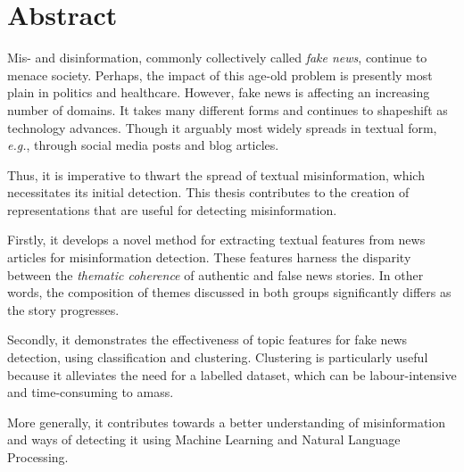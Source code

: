 \begingroup
\let\clearpage\relax
\let\cleardoublepage\relax
\let\cleardoublepage\relax

\chapter*{Abstract}

Mis- and disinformation, commonly collectively called \emph{fake news}, continue to menace society. Perhaps, the impact of this age-old problem is presently most plain in politics and healthcare. However, fake news is affecting an increasing number of domains. It takes many different forms and continues to shapeshift as technology advances. Though it arguably most widely spreads in textual form, \emph{e.g.}, through social media posts and blog articles.

Thus, it is imperative to thwart the spread of textual misinformation, which necessitates its initial detection. This thesis contributes to the creation of representations that are useful for detecting misinformation.

Firstly, it develops a novel method for extracting textual features from news articles for misinformation detection. These features harness the disparity between the \emph{thematic coherence} of authentic and false news stories. In other words, the composition of themes discussed in both groups significantly differs as the story progresses.

Secondly, it demonstrates the effectiveness of topic features for fake news detection, using classification and clustering. Clustering is particularly useful because it alleviates the need for a labelled dataset, which can be labour-intensive and time-consuming to amass.

More generally, it contributes towards a better understanding of misinformation and ways of detecting it using Machine Learning and Natural Language Processing.

\vfill

\endgroup

\vfill
